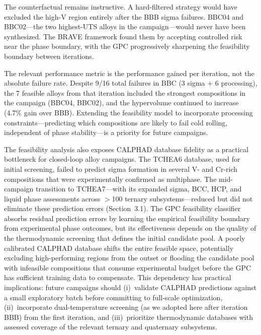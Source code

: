 The counterfactual remains instructive. A hard-filtered strategy would have excluded the high-V region entirely after the BBB sigma failures. BBC04 and BBC02---the two highest-UTS alloys in the campaign---would never have been synthesized. The BRAVE framework found them by accepting controlled risk near the phase boundary, with the GPC progressively sharpening the feasibility boundary between iterations.

The relevant performance metric is the performance gained per iteration, not the absolute failure rate. Despite 9/16 total failures in BBC (3 sigma + 6 processing), the 7 feasible alloys from that iteration included the strongest compositions in the campaign (BBC04, BBC02), and the hypervolume continued to increase (4.7\% gain over BBB). Extending the feasibility model to incorporate processing constraints---predicting which compositions are likely to fail cold rolling, independent of phase stability---is a priority for future campaigns.

The feasibility analysis also exposes CALPHAD database fidelity as a practical bottleneck for closed-loop alloy campaigns. The TCHEA6 database, used for initial screening, failed to predict sigma formation in several V- and Cr-rich compositions that were experimentally confirmed as multiphase. The mid-campaign transition to TCHEA7---with its expanded sigma, BCC, HCP, and liquid phase assessments across $>$100 ternary subsystems---reduced but did not eliminate these prediction errors (Section~3.1). The GPC feasibility classifier absorbs residual prediction errors by learning the empirical feasibility boundary from experimental phase outcomes, but its effectiveness depends on the quality of the thermodynamic screening that defines the initial candidate pool. A poorly calibrated CALPHAD database shifts the entire feasible space, potentially excluding high-performing regions from the outset or flooding the candidate pool with infeasible compositions that consume experimental budget before the GPC has sufficient training data to compensate. This dependency has practical implications: future campaigns should (i)~validate CALPHAD predictions against a small exploratory batch before committing to full-scale optimization, (ii)~incorporate dual-temperature screening (as we adopted here after iteration BBB) from the first iteration, and (iii)~prioritize thermodynamic databases with assessed coverage of the relevant ternary and quaternary subsystems.
